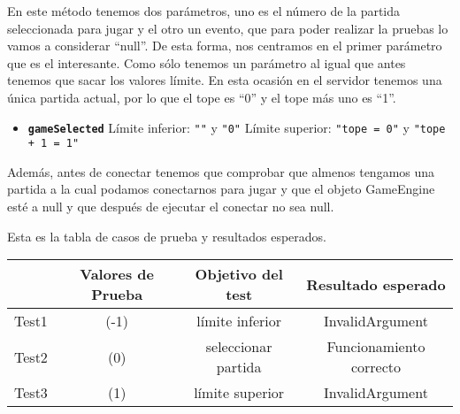 En este método tenemos dos parámetros, uno es el número de la partida seleccionada para jugar y el otro un evento, que para poder realizar la pruebas lo vamos a considerar ``null''. De esta forma, nos centramos en el primer parámetro que es el interesante. Como sólo tenemos un parámetro al igual que antes tenemos que sacar los valores límite. En esta ocasión en el servidor tenemos una única partida actual, por lo que el tope es ``0'' y el tope más uno es ``1''.

\begin{itemize}
\item \textbf{\texttt{gameSelected}}
\subitem Límite inferior: \texttt{""} y \texttt{"0"}
\subitem Límite superior: \texttt{"tope = 0"} y \texttt{"tope + 1 = 1"}
\end{itemize}

Además, antes de conectar tenemos que comprobar que almenos tengamos una partida a la cual podamos conectarnos para jugar y que el objeto GameEngine esté a null y que después de ejecutar el conectar no sea null.

Esta es la tabla de casos de prueba y resultados esperados.

{\footnotesize
\begin{longtable}[c]{lccc}
 & \textbf{Valores de Prueba} & \textbf{Objetivo del test} & \textbf{Resultado esperado} \\
\hline \hline
\endhead

Test1 & (-1) & límite inferior & InvalidArgument\\
Test2 & (0) & seleccionar partida & Funcionamiento correcto\\
Test3 & (1) & límite superior & InvalidArgument\\

\hline
\end{longtable}
}
